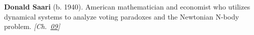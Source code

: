 \textbf{Donald Saari} (b. 1940). American mathematician and economist who utilizes dynamical systems to analyze voting paradoxes and the Newtonian N-body problem. \emph{[Ch.~\hyperref[ch:arrowtheoremtopology]{09}]}


